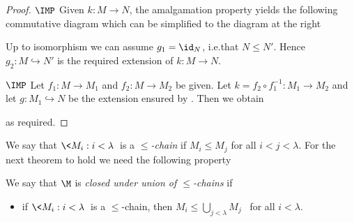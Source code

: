 \begin{proof}
$\IMP$ Given $k:M\to N$, the amalgamation property yields the following commutative diagram which can be simplified to the diagram at the right

\hfil{}
\hfil{}

Up to isomorphism we can assume $g_1=\id_N$, i.e.\@ that $N\le N'$.
Hence $g_2:M\hookrightarrow N'$ is the required extension of $k:M\to N$.

$\IMP$ Let  $f_1:M\to M_1$ and $f_2:M\to M_2$ be given.
Let $k=f_2\circ f_1^{-1}:M_1\to M_2$ and let  $g:M_1\hookrightarrow N$ be the extension ensured by .
Then we obtain

\hfil{}

as required.
\end{proof}

We say that $\<M_i:i<\lambda\>$ is a \emph{$\le$-chain\/} if $M_i\le M_j$ for all $i<j<\lambda$.
For the next theorem to hold we need the following property

\begin{definition}
We say that $\M$ is \emph{closed under union of $\le$-chains\/} if
\begin{itemize}
\item[c8.] if $\<M_i:i<\lambda\>$ is a $\le$-chain,  then $\displaystyle M_i\le\bigcup_{j<\lambda}M_j$ \ for all $i<\lambda$.
\end{itemize}
\end{definition}

